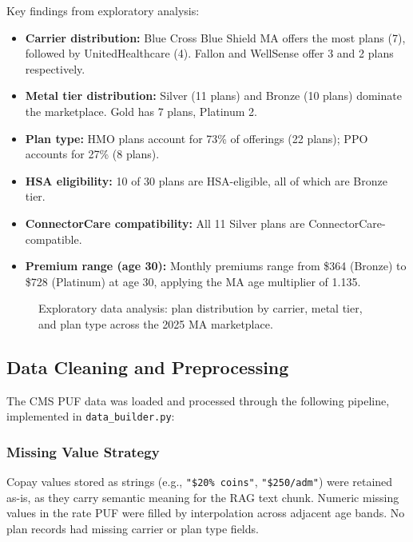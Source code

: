 \documentclass[12pt, letterpaper]{article}
\begin{document}
Key findings from exploratory analysis:
\begin{itemize}
  \item \textbf{Carrier distribution:} Blue Cross Blue Shield MA offers the most plans (7), followed by UnitedHealthcare (4). Fallon and WellSense offer 3 and 2 plans respectively.
  \item \textbf{Metal tier distribution:} Silver (11 plans) and Bronze (10 plans) dominate the marketplace. Gold has 7 plans, Platinum 2.
  \item \textbf{Plan type:} HMO plans account for 73\% of offerings (22 plans); PPO accounts for 27\% (8 plans).
  \item \textbf{HSA eligibility:} 10 of 30 plans are HSA-eligible, all of which are Bronze tier.
  \item \textbf{ConnectorCare compatibility:} All 11 Silver plans are ConnectorCare-compatible.
  \item \textbf{Premium range (age 30):} Monthly premiums range from \$364 (Bronze) to \$728 (Platinum) at age 30, applying the MA age multiplier of 1.135.
\end{itemize}

\begin{figure}[H]
  \centering
  \caption{Exploratory data analysis: plan distribution by carrier, metal tier, and plan type across the 2025 MA marketplace.}
  \label{fig:eda}
\end{figure}

\subsection{Data Cleaning and Preprocessing}

The CMS PUF data was loaded and processed through the following pipeline, implemented in \texttt{data\_builder.py}:

\subsubsection{Missing Value Strategy}

Copay values stored as strings (e.g., \texttt{"\$20\% coins"}, \texttt{"\$250/adm"}) were retained as-is, as they carry semantic meaning for the RAG text chunk. Numeric missing values in the rate PUF were filled by interpolation across adjacent age bands. No plan records had missing carrier or plan type fields.
\end{document}
